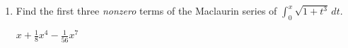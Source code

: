 \documentclass[]{handout}
\begin{document}
\begin{enumerate}[(1)]
\begin{enumerate}
		\

		\item Find the first three \emph{nonzero} terms of the Maclaurin series of $\int_0^x\sqrt{1+t^3}\,dt$.

\begin{answer}
		 $x + \frac{1}{8} x^4 - \frac{1}{56} x^7$
\end{answer}

	\end{enumerate}



\end{enumerate}
\end{document}
